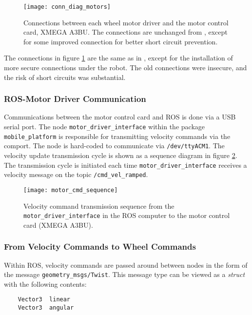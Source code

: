 \begin{figure}[h]
	\centering
	\texttt{[image: conn\_diag\_motors]}
	\caption{Connections between each wheel motor driver and the motor control card, XMEGA A3BU. The connections are unchanged from \cite{aspunvik}, except for some improved connection for better short circuit prevention.}
	\label{fig:conn_diag_motors}
\end{figure}

The connections in figure \ref{fig:conn_diag_motors} are the same as in \cite{aspunvik}, except for the installation of more secure connections under the robot. The old connections were insecure, and the risk of short circuits was substantial.

\subsubsection{ROS-Motor Driver Communication}

Communications between the motor control card and \ac{ROS} is done via a USB serial port. The node \texttt{motor\_driver\_interface} within the package \texttt{mobile\_platform} is responsible for transmitting velocity commands via the comport. The node is hard-coded to communicate via \texttt{/dev/ttyACM1}.  The velocity update transmission cycle is shown as a sequence diagram in figure \ref{fig:motor_cmd_sequence}. The transmission cycle is initiated each time \texttt{motor\_driver\_interface} receives a velocity message on the topic \texttt{/cmd\_vel\_ramped}.

\begin{figure}[h]
	\centering
	\texttt{[image: motor\_cmd\_sequence]}
	\caption{Velocity command transmission sequence from the \texttt{motor\_driver\_interface} in the ROS computer to the motor control card (XMEGA A3BU).}
	\label{fig:motor_cmd_sequence}
\end{figure}

\subsubsection{From Velocity Commands to Wheel Commands}
\label{sec:velocity2wheels}
Within \ac{ROS}, velocity commands are passed around between nodes in the form of the message \texttt{geometry\_msgs/Twist}. This message type can be viewed as a \textit{struct} with the following contents:

\begin{verbatim}
	Vector3  linear
	Vector3  angular
\end{verbatim}

